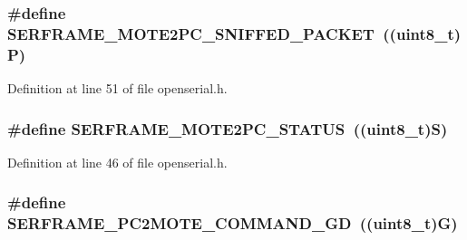 \subsubsection[{\texorpdfstring{S\+E\+R\+F\+R\+A\+M\+E\+\_\+\+M\+O\+T\+E2\+P\+C\+\_\+\+S\+N\+I\+F\+F\+E\+D\+\_\+\+P\+A\+C\+K\+ET}{SERFRAME_MOTE2PC_SNIFFED_PACKET}}]{\setlength{\rightskip}{0pt plus 5cm}\#define S\+E\+R\+F\+R\+A\+M\+E\+\_\+\+M\+O\+T\+E2\+P\+C\+\_\+\+S\+N\+I\+F\+F\+E\+D\+\_\+\+P\+A\+C\+K\+ET~(({\bf uint8\+\_\+t})\textquotesingle{}P\textquotesingle{})}\hypertarget{group___open_serial_ga6328feb8d4acbadd3c403522913ec6eb}{}\label{group___open_serial_ga6328feb8d4acbadd3c403522913ec6eb}


Definition at line 51 of file openserial.\+h.

\subsubsection[{\texorpdfstring{S\+E\+R\+F\+R\+A\+M\+E\+\_\+\+M\+O\+T\+E2\+P\+C\+\_\+\+S\+T\+A\+T\+US}{SERFRAME_MOTE2PC_STATUS}}]{\setlength{\rightskip}{0pt plus 5cm}\#define S\+E\+R\+F\+R\+A\+M\+E\+\_\+\+M\+O\+T\+E2\+P\+C\+\_\+\+S\+T\+A\+T\+US~(({\bf uint8\+\_\+t})\textquotesingle{}S\textquotesingle{})}\hypertarget{group___open_serial_ga4203a6f0869eb08957dc6ff6a6ee2530}{}\label{group___open_serial_ga4203a6f0869eb08957dc6ff6a6ee2530}


Definition at line 46 of file openserial.\+h.

\subsubsection[{\texorpdfstring{S\+E\+R\+F\+R\+A\+M\+E\+\_\+\+P\+C2\+M\+O\+T\+E\+\_\+\+C\+O\+M\+M\+A\+N\+D\+\_\+\+GD}{SERFRAME_PC2MOTE_COMMAND_GD}}]{\setlength{\rightskip}{0pt plus 5cm}\#define S\+E\+R\+F\+R\+A\+M\+E\+\_\+\+P\+C2\+M\+O\+T\+E\+\_\+\+C\+O\+M\+M\+A\+N\+D\+\_\+\+GD~(({\bf uint8\+\_\+t})\textquotesingle{}G\textquotesingle{})}\hypertarget{group___open_serial_ga2a7e44f17590c4c5562bc8df8b8240cc}{}\label{group___open_serial_ga2a7e44f17590c4c5562bc8df8b8240cc}


